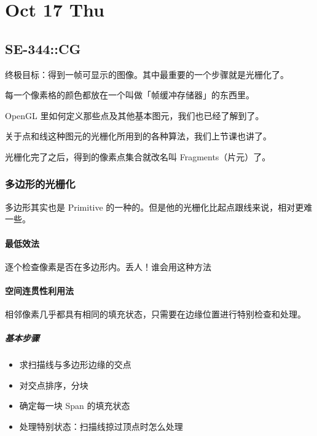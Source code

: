 \documentclass[
]{article}
\date{}
\begin{document}
\hypertarget{header-n0}{%
\section{Oct 17 Thu}\label{header-n0}}

\hypertarget{header-n2}{%
\subsection{SE-344::CG}\label{header-n2}}

终极目标：得到一帧可显示的图像。其中最重要的一个步骤就是光栅化了。

每一个像素格的颜色都放在一个叫做「帧缓冲存储器」的东西里。

OpenGL 里如何定义那些点及其他基本图元，我们也已经了解到了。

关于点和线这种图元的光栅化所用到的各种算法，我们上节课也讲了。

光栅化完了之后，得到的像素点集合就改名叫 Fragments（片元）了。

\hypertarget{header-n8}{%
\subsubsection{多边形的光栅化}\label{header-n8}}

多边形其实也是 Primitive
的一种的。但是他的光栅化比起点跟线来说，相对更难一些。

\hypertarget{header-n10}{%
\paragraph{\texorpdfstring{\textbf{最}低效法}{最低效法}}\label{header-n10}}

逐个检查像素是否在多边形内。丢人！谁会用这种方法

\hypertarget{header-n12}{%
\paragraph{空间连贯性利用法}\label{header-n12}}

相邻像素几乎都具有相同的填充状态，只需要在边缘位置进行特别检查和处理。

\hypertarget{header-n14}{%
\subparagraph{基本步骤}\label{header-n14}}

\begin{itemize}
\item
  求扫描线与多边形边缘的交点
\item
  对交点排序，分块
\item
  确定每一块 Span 的填充状态
\item
  处理特别状态：扫描线掠过顶点时怎么处理
\end{itemize}
\end{document}
